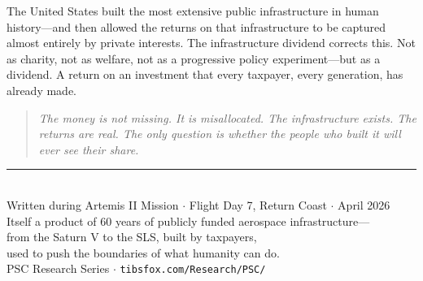 \documentclass[11pt,letterpaper]{article}
\begin{document}
The United States built the most extensive public infrastructure in human history---and then allowed the returns on that infrastructure to be captured almost entirely by private interests. The infrastructure dividend corrects this. Not as charity, not as welfare, not as a progressive policy experiment---but as a dividend. A return on an investment that every taxpayer, every generation, has already made.

\begin{quote}
\itshape The money is not missing. It is misallocated. The infrastructure exists. The returns are real. The only question is whether the people who built it will ever see their share.
\end{quote}

\vfill
\begin{center}
\rule{0.4\textwidth}{0.4pt}\\[0.5em]
{\small\color{pscpurple} Written during Artemis II Mission \(\cdot\) Flight Day 7, Return Coast \(\cdot\) April 2026\\
Itself a product of 60 years of publicly funded aerospace infrastructure---\\
from the Saturn V to the SLS, built by taxpayers,\\
used to push the boundaries of what humanity can do.\\[0.3em]
PSC Research Series \(\cdot\) \texttt{tibsfox.com/Research/PSC/}}
\end{center}
\end{document}
